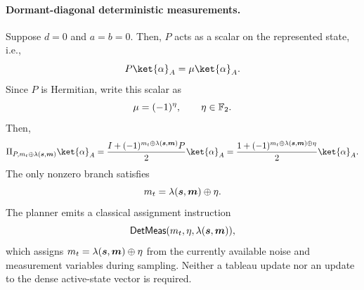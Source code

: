 \documentclass[a4paper,onecolumn,unpublished]{quantumarticle}
\DeclarePairedDelimiter\rbra{\lparen}{\rparen}
\newcommand{\iFont}[1]{\textsf{#1}}
\newcommand{\iDetMeas}{\iFont{DetMeas}}
\newcommand{\FF}{\mathbb{F}}
\begin{document}
\paragraph{Dormant-diagonal deterministic measurements.}
Suppose $d = 0$ and $a = b = 0$.
Then, $P$ acts as a scalar on the represented state, i.e.,
\begin{equation*}
    P\ket{\alpha}_A = \mu \ket{\alpha}_A.
\end{equation*}
Since $P$ is Hermitian, write this scalar as
\begin{equation*}
    \mu=\rbra{-1}^{\eta}, \qquad \eta\in\FF_2.
\end{equation*}
Then,
\begin{equation*}
    \Pi_{P,m_t\oplus \lambda\rbra{\bm{s},\bm{m}}}\ket{\alpha}_A = \frac{I+ \rbra{-1}^{m_t\oplus \lambda\rbra{\bm{s},\bm{m}}}P}{2}\ket{\alpha}_A = \frac{1+\rbra{-1}^{m_t\oplus \lambda\rbra{\bm{s},\bm{m}} \oplus \eta}}{2}\ket{\alpha}_A.
\end{equation*}
The only nonzero branch satisfies
\begin{equation*}
    m_t = \lambda\rbra{\bm{s},\bm{m}} \oplus \eta.
\end{equation*}
The planner emits a classical assignment instruction
\begin{equation*}
    \iDetMeas\rbra{m_t, \eta, \lambda\rbra{\bm{s},\bm{m}}},
\end{equation*}
which assigns $m_t = \lambda\rbra{\bm{s},\bm{m}} \oplus \eta$ from the currently available noise and measurement variables during sampling.
Neither a tableau update nor an update to the dense active-state vector is required.
\end{document}
